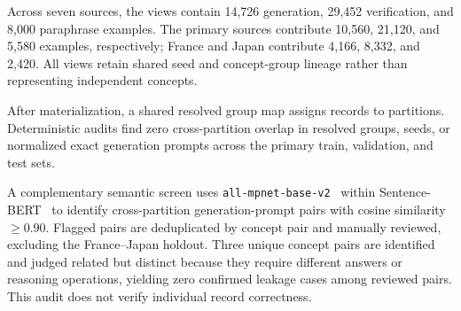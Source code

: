\documentclass[a4paper,fleqn]{cas-sc}
\begin{document}
Across seven sources, the views contain 14,726 generation, 29,452 verification, and 8,000 paraphrase examples. The primary sources contribute 10,560, 21,120, and 5,580 examples, respectively; France and Japan contribute 4,166, 8,332, and 2,420. All views retain shared seed and concept-group lineage rather than representing independent concepts.

After materialization, a shared resolved group map assigns records to partitions. Deterministic audits find zero cross-partition overlap in resolved groups, seeds, or normalized exact generation prompts across the primary train, validation, and test sets.

A complementary semantic screen uses \texttt{all-mpnet-base-v2}~\cite{allmpnetbasev2} within Sentence-BERT~\cite{reimers2019sentencebert} to identify cross-partition generation-prompt pairs with cosine similarity $\geq 0.90$. Flagged pairs are deduplicated by concept pair and manually reviewed, excluding the France--Japan holdout. Three unique concept pairs are identified and judged related but distinct because they require different answers or reasoning operations, yielding zero confirmed leakage cases among reviewed pairs. This audit does not verify individual record correctness.

\begin{table}[H]
\centering
\caption{Validated primary-source answer-generation records by reasoning level and question format. France and Japan are excluded.}
\label{tab:dataset_by_level}
\end{table}
\end{document}
